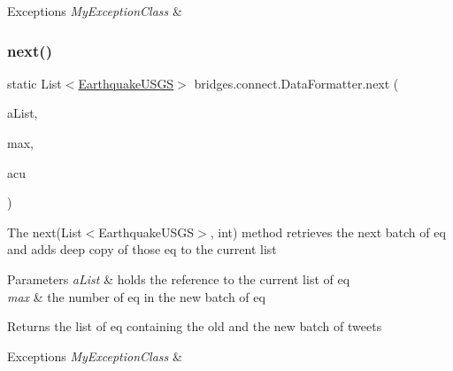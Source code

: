 \begin{DoxyExceptions}{Exceptions}
{\em My\+Exception\+Class} & \\
\hline
\end{DoxyExceptions}
\mbox{\label{classbridges_1_1connect_1_1_data_formatter_ad451dd96b927702127d383e85fc98661}} 
\subsubsection{\texorpdfstring{next()}{next()}\hspace{0.1cm}{\footnotesize\ttfamily [2/2]}}
{\footnotesize\ttfamily static List$<$\mbox{\hyperlink{classbridges_1_1data__src__dependent_1_1_earthquake_u_s_g_s}{Earthquake\+U\+S\+GS}}$>$ bridges.\+connect.\+Data\+Formatter.\+next (\begin{DoxyParamCaption}\item[{List$<$ \mbox{\hyperlink{classbridges_1_1data__src__dependent_1_1_earthquake_u_s_g_s}{Earthquake\+U\+S\+GS}} $>$}]{a\+List,  }\item[{int}]{max,  }\item[{\mbox{\hyperlink{classbridges_1_1data__src__dependent_1_1_u_s_g_saccount}{U\+S\+G\+Saccount}}}]{acu }\end{DoxyParamCaption})\hspace{0.3cm}{\ttfamily [static]}}

The next(\+List$<$\+Earthquake\+U\+S\+G\+S$>$, int) method retrieves the next batch of eq and adds deep copy of those eq to the current list 
\begin{DoxyParams}{Parameters}
{\em a\+List} & holds the reference to the current list of eq \\
\hline
{\em max} & the number of eq in the new batch of eq \\
\hline
\end{DoxyParams}
\begin{DoxyReturn}{Returns}
the list of eq containing the old and the new batch of tweets 
\end{DoxyReturn}

\begin{DoxyExceptions}{Exceptions}
{\em My\+Exception\+Class} & \\
\hline
\end{DoxyExceptions}
\mbox{\label{classbridges_1_1connect_1_1_data_formatter_af9b878e5c092234a6ab5f8c11bee1fbd}} 
